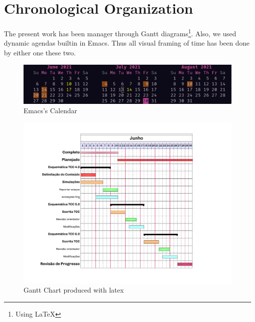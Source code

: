 \documentclass[
12pt,				%
openright,			%
oneside,			%
a4paper,			%
brazil,				%
english,			%
]{abntex2}
\begin{document}




\section{Chronological Organization}

The present work has been manager through Gantt
diagrams\footnote{Using \LaTeX}. Also, we used dynamic agendas builtin
in Emacs. Thus all visual framing of time has been done by either one
these two.

\begin{figure}[ht]
  \centering
  \caption{\label{fig:calendar} Emacs's Calendar}
  \includegraphics[width=0.7\linewidth]{Imagens/calendar.png}
\end{figure}

\begin{figure}[ht]
  \centering
  \caption{\label{fig:gantt} Gantt Chart produced with latex}
  \includegraphics[width=0.7\linewidth]{Schedule/cronograma-tcc.pdf}
\end{figure}
\end{document}
